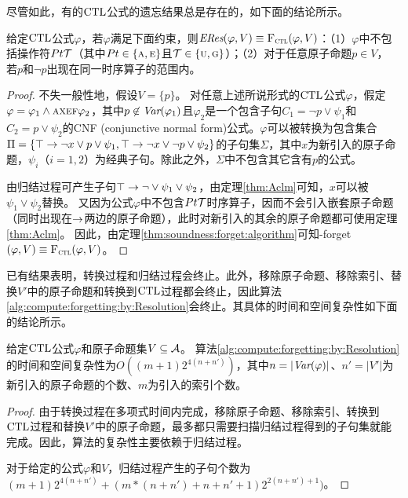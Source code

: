 尽管如此，有的$\textrm{CTL}$公式的遗忘结果总是存在的，如下面的结论所示。
\begin{proposition} \label{pro:fogCTL}
	给定$\textrm{CTL}$公式$\varphi$，若$\varphi$满足下面约束，则$\emph{ERes}(\varphi,V) \equiv {\textsc{F}_{\textsc{ctl}}}(\varphi, V)$：（1）$\varphi$中不包括操作符$Pt {\cal T}$（其中$Pt \in \{\textsc{a}, \textsc{e}\}$且${\cal T} \in \{\textsc{u}, \textsc{g}\}$）；（2）对于任意原子命题$p\in V$， 若$p$和$\neg p$出现在同一时序算子的范围内。
\end{proposition}
\begin{proof}
	不失一般性地，假设$V = \{p\}$。
	对任意上述所说形式的$\textrm{CTL}$公式$\varphi$，假定$\varphi = \varphi_1 \wedge \textsc{a} \textsc{x} \textsc{e} \textsc{f} \varphi_2$，其中$p\not \in \textit{Var}(\varphi_1)$且$\varphi_2$是一个包含子句$C_1 = \neg p \vee \psi_1$和$C_2 = p \vee \psi_2$的CNF (conjunctive normal form)公式。$\varphi$可以被转换为包含集合$\Pi = \{\top \rightarrow \neg x \vee p \vee  \psi_1,  \top \rightarrow \neg x \vee \neg p \vee \psi_2\}$的子句集$\Sigma$，其中$x$为新引入的原子命题，$\psi_i$（$i=1,2$）为经典子句。除此之外，$\Sigma$中不包含其它含有$p$的公式。
	
	由归结过程可产生子句$\top \rightarrow \neg \vee \psi_1 \vee \psi_2$，由定理\ref{thm:Aclm}可知，$x$可以被$\psi_1 \vee \psi_2$替换。
	又因为公式$\varphi$中不包含$Pt {\cal T}$时序算子，因而不会引入嵌套原子命题（同时出现在$\rightarrow$两边的原子命题），此时对新引入的其余的原子命题都可使用定理\ref{thm:Aclm}。
	因此，由定理\ref{thm:soundness:forget:algorithm}可知\CTL-forget$(\varphi,V)\equiv {\textsc{F}_{\textsc{ctl}}}(\varphi, V)$。
\end{proof}




\label{chp4:sect:complex}
已有结果表明，转换过程和归结过程会终止\cite{zhang2014resolution}。此外，移除原子命题、移除索引、替换$V'$中的原子命题和转换到$\textrm{CTL}$过程都会终止，因此算法\ref{alg:compute:forgetting:by:Resolution}会终止。其具体的时间和空间复杂性如下面的结论所示。


\begin{proposition}\label{pro:complexity}
	给定$\textrm{CTL}$公式$\varphi$和原子命题集$V \subseteq {\cal A}$。
	算法\ref{alg:compute:forgetting:by:Resolution}的时间和空间复杂性为$O((m+1)2^{4(n+n')})$，其中$n=|\textit{Var}(\varphi)|$、$n'=|V'|$为新引入的原子命题的个数、$m$为引入的索引个数。
\end{proposition}
\begin{proof}
	由于转换过程在多项式时间内完成，移除原子命题、移除索引、转换到$\textrm{CTL}$过程和替换$V'$中的原子命题，最多都只需要扫描归结过程得到的子句集就能完成。因此，算法的复杂性主要依赖于归结过程。
	
	对于给定的公式$\varphi$和$V$，归结过程产生的子句个数为$(m+1)2^{4(n+n')}+(m*(n+n')+n+n'+1)2^{2(n+n')+1})$。
\end{proof}

